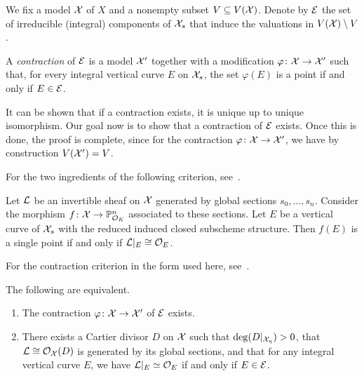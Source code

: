 We fix a model $\mathcal X$ of $X$ and a nonempty subset $V \subseteq V(\mathcal X)$.
Denote by $\mathcal{E}$ the set of irreducible (integral) components of $\mathcal X_s$ that induce the valuations in $V(\mathcal X)\setminus V$.

\begin{definition}
    A \textit{contraction} of $\mathcal{E}$ is a model $\mathcal X'$ together with a modification $\varphi \colon \mathcal X \to \mathcal X'$ such that, for every integral vertical curve $E$ on $\mathcal X_s$,
    the set $\varphi(E)$ is a point if and only if $E \in \mathcal{E}$.
\end{definition}

It can be shown that if a contraction exists, it is unique up to unique isomorphism.
Our goal now is to show that a contraction of $\mathcal{E}$ exists.
Once this is done, the proof is complete, since for the contraction $\varphi \colon \mathcal X \to \mathcal X'$, we have by construction $V(\mathcal X') = V$.

For the two ingredients of the following criterion, see~\cite[Lemmas 8.3.29 and 8.3.3]{Liu}.

\begin{lemma} \label{lem:criterion_point}
    Let $\mathcal{L}$ be an invertible sheaf on $\mathcal X$ generated by global sections $s_0, \dots, s_n$.
    Consider the morphism $f \colon \mathcal X \to \mathbb P^n_{\mathcal O_K}$ associated to these sections.
    Let $E$ be a vertical curve of $\mathcal X_s$ with the reduced induced closed subscheme structure.
    Then $f(E)$ is a single point if and only if $\mathcal{L}|_E \cong \mathcal{O}_E$.
\end{lemma}

For the contraction criterion in the form used here, see~\cite[Proposition 8.3.30]{Liu}.

\begin{proposition} \label{prop:exist_contr}
    The following are equivalent.
    \begin{enumerate}[label=\textup{(\alph*)}]
    \item The contraction $\varphi \colon \mathcal X \to \mathcal X'$ of $\mathcal{E}$ exists. \label{prop:exist_contr_i}
    \item There exists a Cartier divisor $D$ on $\mathcal X$ such that $\deg(D|_{\mathcal X_\eta}) > 0$, that $\mathcal{L} \cong \mathcal{O}_\mathcal X(D)$ is generated
    by its global sections, and that for any integral vertical curve $E$, we have $\mathcal{L}|_E \simeq \mathcal{O}_E$ if and only if $E \in \mathcal{E}$. \label{prop:exist_contr_ii}
    \end{enumerate}
\end{proposition}

